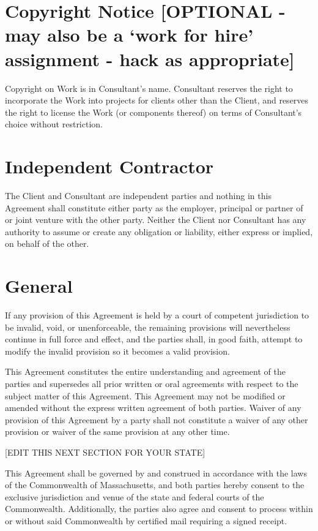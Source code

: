 \documentclass[10pt]{article}
\begin{document}
	
	\section{Copyright Notice [OPTIONAL - may also be a `work for hire' assignment - hack as appropriate]}
	
	Copyright on Work is in Consultant's name.  Consultant reserves the right to incorporate the Work into projects for clients other than the Client, and reserves the right to license the Work (or components thereof) on terms of Consultant's choice without restriction.
	
	
	\section{Independent Contractor}
	
	The Client and Consultant are independent parties and nothing in this
	Agreement shall constitute either party as the employer, principal or
	partner of or joint venture with the other party.  Neither the Client nor
	Consultant has any authority to assume or create any obligation or
	liability, either express or implied, on behalf of the other.
	
	\section{General}
	
	If any provision of this Agreement is held by a court of competent
	jurisdiction to be invalid, void, or unenforceable, the remaining provisions
	will nevertheless continue in full force and effect, and the parties shall,
	in good faith, attempt to modify the invalid provision so it becomes a valid
	provision.
	
	This Agreement constitutes the entire understanding and agreement of the
	parties and supersedes all prior written or oral agreements with respect to
	the subject matter of this Agreement. This Agreement may not be modified or
	amended without the express written agreement of both parties. Waiver of any
	provision of this Agreement by a party shall not constitute a waiver of any
	other provision or waiver of the same provision at any other time.
	
	[EDIT THIS NEXT SECTION FOR YOUR STATE]
	
	This Agreement shall be governed by and construed in accordance with the
	laws of the Commonwealth of Massachusetts, and both parties hereby consent
	to the exclusive jurisdiction and venue of the state and federal courts of
	the Commonwealth. Additionally, the parties also agree and consent to
	process within or without said Commonwealth by certified mail requiring a
	signed receipt.
	
\end{document}
